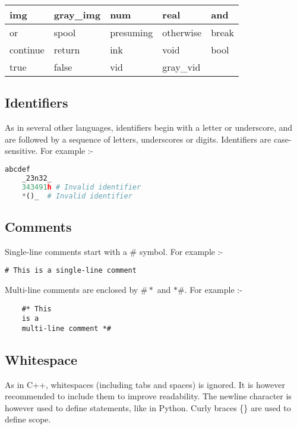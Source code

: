\documentclass[a4paper, 11pt]{article}
\begin{document}
  \begin{tabular}{ |p{3cm}|p{3cm}|p{3cm}|p{3cm}|p{3cm}| }
    \hline
    img & gray\_img & num & real & and\\
    \hline
    or & spool & presuming & otherwise & break \\
    \hline
    continue & return & ink & void & bool\\
    \hline
    true & false & vid & gray\_vid &\\
    \hline
   \end{tabular}

  \subsection{Identifiers}
  
    As in several other languages, identifiers begin with a letter or underscore, and are followed by a sequence of letters, underscores or digits. Identifiers are case-sensitive. For example :-
   \begin{lstlisting}[language=Python]
    abcdef
    _23n32_
    343491h # Invalid identifier
    *()_  # Invalid identifier\end{lstlisting}


  \subsection{Comments}

  Single-line comments start with a $\#$ symbol. For example :-

  \begin{lstlisting}[]
    # This is a single-line comment\end{lstlisting}

  Multi-line comments are enclosed by $\#*$ and $*\#$. For example :-

  \begin{lstlisting}
    #* This
    is a
    multi-line comment *#\end{lstlisting}

    \subsection{Whitespace}

    As in C++, whitespaces (including tabs and spaces) is ignored. It is however recommended to include them to improve readability. 
    The newline character is however used to define statements, like in Python. Curly braces \{\} are used to define scope. 
\end{document}
